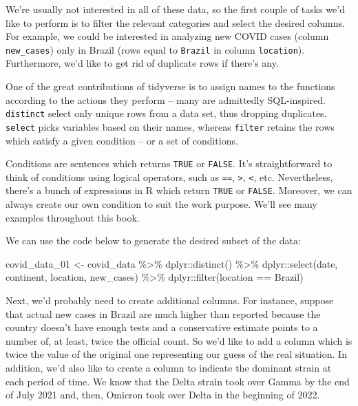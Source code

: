 \documentclass[
]{book}
\newenvironment{Shaded}{\begin{snugshade}}{\end{snugshade}}
\newcommand{\FunctionTok}[1]{\textcolor[rgb]{0.00,0.00,0.00}{#1}}
\newcommand{\NormalTok}[1]{#1}
\newcommand{\OtherTok}[1]{\textcolor[rgb]{0.56,0.35,0.01}{#1}}
\newcommand{\SpecialCharTok}[1]{\textcolor[rgb]{0.00,0.00,0.00}{#1}}
\newcommand{\StringTok}[1]{\textcolor[rgb]{0.31,0.60,0.02}{#1}}
\begin{document}
We're usually not interested in all of these data, so the first couple of tasks we'd like to perform is to filter the relevant categories and select the desired columns. For example, we could be interested in analyzing new COVID cases (column \texttt{new\_cases}) only in Brazil (rows equal to \texttt{Brazil} in column \texttt{location}). Furthermore, we'd like to get rid of duplicate rows if there's any.

One of the great contributions of tidyverse is to assign names to the functions according to the actions they perform -- many are admittedly SQL-inspired. \texttt{distinct} select only unique rows from a data set, thus dropping duplicates. \texttt{select} picks variables based on their names, whereas \texttt{filter} retains the rows which satisfy a given condition -- or a set of conditions.

Conditions are sentences which returns \texttt{TRUE} or \texttt{FALSE}. It's straightforward to think of conditions using logical operators, such as \texttt{==}, \texttt{\textgreater{}}, \texttt{\textless{}}, etc. Nevertheless, there's a bunch of expressions in R which return \texttt{TRUE} or \texttt{FALSE}. Moreover, we can always create our own condition to suit the work purpose. We'll see many examples throughout this book.

We can use the code below to generate the desired subset of the data:

\begin{Shaded}
\begin{Highlighting}[]
\NormalTok{covid\_data\_01 }\OtherTok{\textless{}{-}}\NormalTok{ covid\_data }\SpecialCharTok{\%\textgreater{}\%} 
\NormalTok{  dplyr}\SpecialCharTok{::}\FunctionTok{distinct}\NormalTok{() }\SpecialCharTok{\%\textgreater{}\%} 
\NormalTok{  dplyr}\SpecialCharTok{::}\FunctionTok{select}\NormalTok{(date, continent, location, new\_cases) }\SpecialCharTok{\%\textgreater{}\%} 
\NormalTok{  dplyr}\SpecialCharTok{::}\FunctionTok{filter}\NormalTok{(location }\SpecialCharTok{==} \StringTok{\textquotesingle{}Brazil\textquotesingle{}}\NormalTok{)}
\end{Highlighting}
\end{Shaded}

Next, we'd probably need to create additional columns. For instance, suppose that actual new cases in Brazil are much higher than reported because the country doesn't have enough tests and a conservative estimate points to a number of, at least, twice the official count. So we'd like to add a column which is twice the value of the original one representing our guess of the real situation. In addition, we'd also like to create a column to indicate the dominant strain at each period of time. We know that the Delta strain took over Gamma by the end of July 2021 and, then, Omicron took over Delta in the beginning of 2022.
\end{document}
